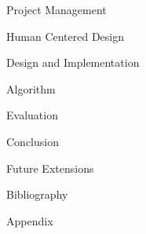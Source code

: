 \documentclass[twoside, a4paper, titlepage]{article}
\begin{document}
\newpage
\begin{section}{Project Management}

\end{section}

\newpage
\begin{section}{Human Centered Design}

\end{section}

\newpage
\begin{section}{Design and Implementation}

\end{section}

\newpage
\begin{section}{Algorithm}

\end{section}

\newpage
\begin{section}{Evaluation}

\end{section}

\newpage
\begin{section}{Conclusion}

\end{section}

\newpage
\begin{section}{Future Extensions}

\end{section}

\newpage
\begin{section}{Bibliography}

\end{section}

\newpage
\begin{section}{Appendix}

\end{section}

\end{document}
